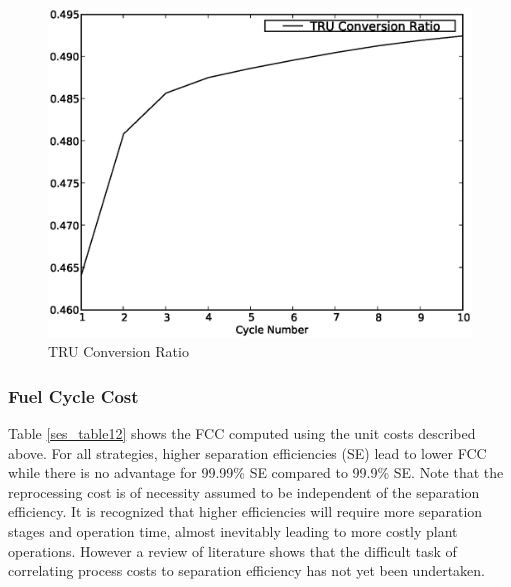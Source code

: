 \begin{figure}[htbp]
\caption{TRU Conversion Ratio}
\label{ses_fig09}
\begin{center}
\includegraphics[scale=0.5]{se_sensitivity/figs/TruCR.eps}
\end{center}
\end{figure}



\subsubsection{Fuel Cycle Cost}
\label{ses_sec:fcc}
Table \ref{ses_table12} shows the FCC computed 
using the unit costs described above. For all strategies, higher
separation efficiencies (SE) lead to lower FCC while there is no
advantage for 99.99\% SE compared to 99.9\% SE.  Note that the
reprocessing cost is of necessity assumed to be independent of the
separation efficiency.  It is recognized that higher efficiencies will
require more separation stages and operation time, almost inevitably
leading to more costly plant operations.  However a review of literature
shows that the difficult task of correlating process costs to separation
efficiency has not yet been undertaken.

